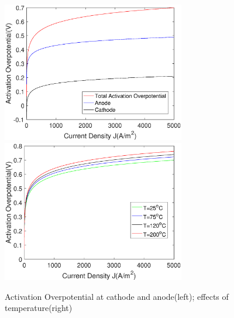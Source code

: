 \begin{figure}[h] 
\includegraphics[width=8cm] {Activation.eps} 
\includegraphics[width=8cm]{ActivationT.eps}
\caption{Activation Overpotential at cathode and anode(left); effects of temperature(right)} 
\label{fig:activation}
\end{figure} 

